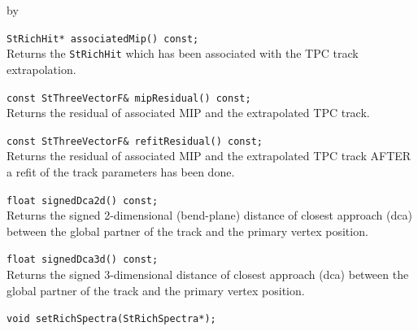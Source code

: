 \documentclass[twoside]{article}
\newcommand{\entrylabel}[1]{\mbox{\textbf{{#1}}}\hfil}%
\newenvironment{entry}
{\begin{list}{}%
    {\renewcommand{\makelabel}{\entrylabel}%
     \setlength{\labelwidth}{90pt}%
     \setlength{\leftmargin}{\labelwidth}
     \advance\leftmargin by \labelsep%
      }%
    }%
  {\end{list}}
\newcommand{\Entrylabel}[1]%
{\raisebox{0pt}[1ex][0pt]{\makebox[\labelwidth][l]%
    {\parbox[t]{\labelwidth}{\hspace{0pt}\textbf{{#1}}}}}}
\newenvironment{Entry}%
{\renewcommand{\entrylabel}{\Entrylabel}\begin{entry}}%
  {\end{entry}}
\begin{document}
\begin{Entry}
    \verb+StRichHit* associatedMip() const;+\\
    Returns the \texttt{StRichHit} which has been
    associated with the TPC track extrapolation.
    
    \verb+const StThreeVectorF& mipResidual() const;+\\
    Returns the residual of associated MIP and the
    extrapolated TPC track.
    
    \verb+const StThreeVectorF& refitResidual() const;+\\
    Returns the residual of associated MIP and the
    extrapolated TPC track AFTER a refit of the track
    parameters has been done.

    \verb+float signedDca2d() const;+\\
    Returns the signed 2-dimensional (bend-plane)
    distance of closest approach (dca) between the
    global partner of the track and the primary vertex
    position.
    
    \verb+float signedDca3d() const;+\\
    Returns the signed 3-dimensional
    distance of closest approach (dca) between the
    global partner of the track and the primary vertex
    position.

    \verb+void setRichSpectra(StRichSpectra*);+\\
\end{Entry}
\clearpage
\end{document}
